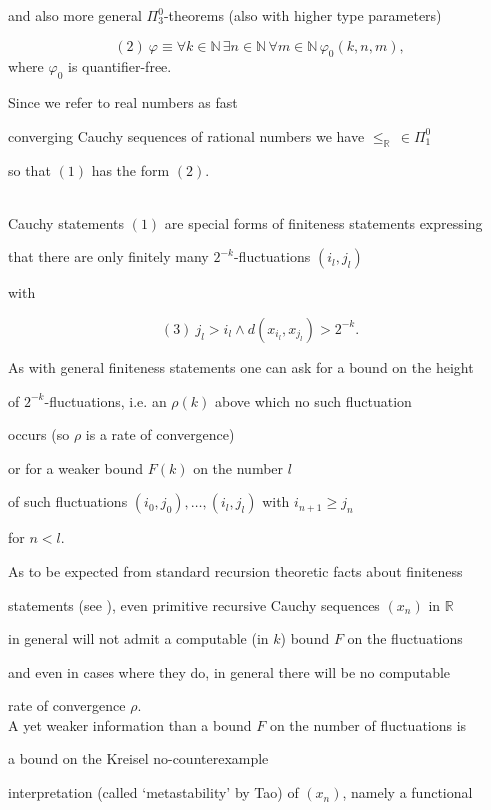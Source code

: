 \documentclass[1p]{elsarticle}
\newcommand{\RR}{\ensuremath{\mathbb{R}}}
\newcommand{\NN}{\ensuremath{\mathbb{N}}}
\theoremstyle{plain}
\theoremstyle{definition}
\theoremstyle{remark}
\theoremstyle{definition}
\begin{document}
and also more general $\Pi^0_3$-theorems (also with higher type parameters) 

\[ (2) \ \varphi\equiv 

\forall k\in\NN\,\exists n\in\NN\,

\forall m\in\NN\,\varphi_0(k,n,m),\] where $\varphi_0$ is quantifier-free. 

Since we refer to real numbers as fast 

converging Cauchy sequences of rational numbers we have $\le_{\RR}\,\in\Pi^0_1$ 

so that $(1)$ has the form $(2).$

\\[2mm] 

Cauchy statements $(1)$ are special forms of finiteness statements expressing 

that there are only finitely many $2^{-k}$-fluctuations $(i_l,j_l)$ 

with 

\[ (3) \ j_l>i_l\wedge d(x_{i_l},x_{j_l})>2^{-k}. \] 

As with general finiteness statements one can ask for a bound on the height 

of $2^{-k}$-fluctuations, i.e. an $\rho(k)$ above which no such fluctuation 

occurs (so $\rho$ is a rate of convergence) 

or for a weaker bound $F(k)$ on the number $l$ 

of such fluctuations $(i_0,j_0),\ldots,(i_l,j_l)$ with $i_{n+1}\ge j_{n}$ 

for $n<l.$ 

As to be expected from standard recursion theoretic facts about finiteness 

statements (see \cite{Luckhardt(89)}), even primitive recursive Cauchy sequences $(x_n)$ in $\RR$ 

in general will not admit a computable (in $k$) bound $F$ on the fluctuations 

and even in cases where they do, in general there will be no computable 

rate of convergence $\rho.$\\[2mm] 

A yet weaker information than a bound $F$ on the number of fluctuations is 

a bound on the Kreisel no-counterexample 

interpretation (called `metastability' by Tao) of $(x_n)$, namely a functional 
\end{document}
